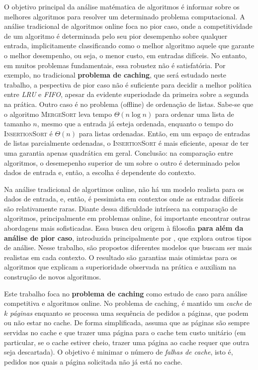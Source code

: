 O objetivo principal da análise matématica de algoritmos é informar sobre os melhores algoritmos para resolver um determinado problema computacional. A análise tradicional de algoritmos online foca no pior caso, onde a competitividade de um algoritmo é determinada pelo seu pior desempenho sobre qualquer entrada, implicitamente classificando como o melhor algoritmo aquele que garante o melhor desempenho, ou seja, o menor custo, em entradas difíceis. No entanto, em muitos problemas fundamentais, essa robustez não é satisfatória. Por exemplo, no tradicional \textbf{problema de caching}, que será estudado neste trabalho, a pespectiva de pior caso não é suficiente para decidir a melhor política entre \emph{LRU} e \emph{FIFO}, apesar da evidente superiodade da primeira sobre a segunda na prática. Outro caso é no problema (offline) de ordenação de listas. Sabe-se que o algoritmo \textsc{MergeSort} leva tempo \(\Theta(n \log n)\) para ordenar uma lista de tamanho \(n\), mesmo que a entrada já esteja ordenada, enquanto o tempo do \textsc{InsertionSort} é \(\Theta(n)\) para listas ordenadas. Então, em um espaço de entradas de listas parcialmente ordenadas, o \textsc{InsertionSort} é mais eficiente, apesar de ter uma garantia apenas quadrática em geral. Conclusão: na comparação entre algoritmos, o desemepenho superior de um sobre o outro é determinado pelos dados de entrada e, então, a escolha é dependente do contexto. 

 Na análise tradicional de algortimos online, não há um modelo realista para os dados de entrada, e, então, é pessimista em contextos onde as entradas difíceis são relativamente raras. Diante dessa dificuldade intríseca na comparação de algoritmos, principalmente em problemas online, foi importante encontrar outras abordagens mais sofisticadas. Essa busca deu origem à filosofia \textbf{para além da análise de pior caso}, introduzida principalmente por \textcite{Roughgarden19}, que explora outros tipos de análise. Nesse trabalho, são propostos diferentes modelos que buscam ser mais realistas em cada contexto. O resultado são garantias mais otimistas para os algoritmos que explicam a superioridade observada na prática e auxiliam na construção de novos algoritmos.

 Este trabalho foca no \textbf{problema de caching} como estudo de caso para análise competitiva e algoritmos online. No problema de caching, é mantido um \emph{cache} de \(k\) \emph{páginas} enquanto se processa uma sequência de pedidos a páginas, que podem ou não estar no cache. De forma simplificada, assuma que as páginas são sempre servidas no cache e que trazer uma página para o cache tem custo unitário (em particular, se o cache estiver cheio, trazer uma página ao cache requer que outra seja descartada). O objetivo é minimar o número de \emph{falhas de cache}, isto é, pedidos nos quais a página solicitada não já está no cache. 


